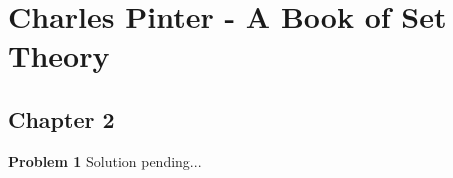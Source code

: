 \documentclass{article}
\begin{document}
\section*{Charles Pinter - A Book of Set Theory}
\subsection*{Chapter 2}

\textbf{Problem 1}
Solution pending...
\end{document}
